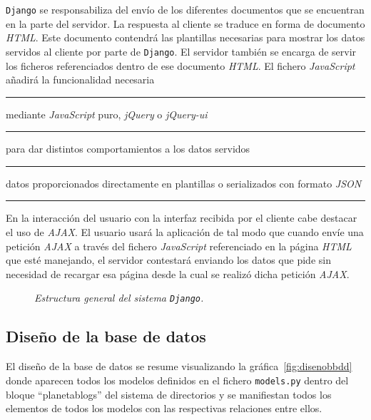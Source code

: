 \documentclass[a4paper, 12pt]{book}
\begin{document}
\texttt{Django} se responsabiliza del env\'io de los diferentes documentos que se encuentran en la parte del servidor. La respuesta al cliente se traduce
en forma de documento \textit{HTML}. Este documento contendr\'a las plantillas necesarias para mostrar los datos servidos al cliente por parte de 
\texttt{Django}. El servidor tambi\'en se encarga de servir los ficheros referenciados dentro de ese documento \textit{HTML}. El fichero \textit{JavaScript}
a\~nadir\'a la funcionalidad necesaria \rule[1mm]{4mm}{0.1mm}mediante \textit{JavaScript} puro, \textit{jQuery} o \textit{jQuery-ui}\rule[1mm]{4mm}{0.1mm}
para dar distintos comportamientos a los datos servidos \rule[1mm]{4mm}{0.1mm}datos proporcionados directamente en plantillas o serializados con formato
\textit{JSON}\rule[1mm]{4mm}{0.1mm}

En la interacci\'on del usuario con la interfaz recibida por el cliente cabe destacar el uso de \textit{AJAX}. El usuario usar\'a la aplicaci\'on de tal
modo que cuando env\'ie una petici\'on \textit{AJAX} a trav\'es del fichero \textit{JavaScript} referenciado en la p\'agina \textit{HTML} que est\'e manejando,
el servidor contestar\'a enviando los datos que pide sin necesidad de recargar esa p\'agina desde la cual se realiz\'o dicha petici\'on \textit{AJAX}.
\begin{figure}
  \centering
  \caption{\textit{Estructura general del sistema \texttt{Django}.}}
  \label{fig:introestructura}
\end{figure}


\subsection{Dise\~no de la base de datos} 
\label{sec:disenobbdd}
El dise\~no de la base de datos se resume visualizando la gr\'afica~\ref{fig:disenobbdd} donde aparecen todos los modelos definidos en el fichero 
\texttt{models.py} dentro del bloque ``planetablogs'' del sistema de directorios y se manifiestan todos los elementos de todos los modelos con las
respectivas relaciones entre ellos. 
\end{document}
